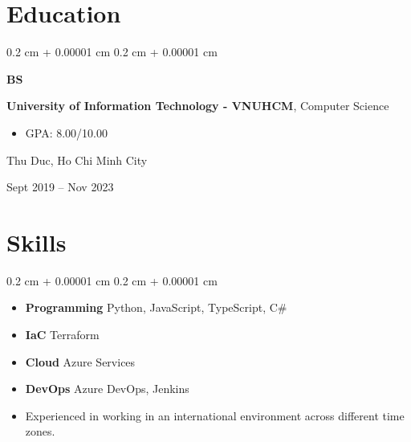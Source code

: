 \documentclass[10pt, a4paper]{article}
\newenvironment{highlights}{
    \begin{itemize}[
        topsep=0.10 cm,
        parsep=0.10 cm,
        partopsep=0pt,
        itemsep=0pt,
        leftmargin=0.4 cm + 10pt
    ]
}{
    \end{itemize}
} %
\newenvironment{highlightsforbulletentries}{
    \begin{itemize}[
        topsep=0.10 cm,
        parsep=0.10 cm,
        partopsep=0pt,
        itemsep=0pt,
        leftmargin=10pt
    ]
}{
    \end{itemize}
} %
\newenvironment{onecolentry}{
    \begin{adjustwidth}{
        0.2 cm + 0.00001 cm
    }{
        0.2 cm + 0.00001 cm
    }
}{
    \end{adjustwidth}
} %
\newenvironment{threecolentry}[3][]{
    \onecolentry
    \def\thirdColumn{#3}
    \setcolumnwidth{1 cm, \fill, 4.5 cm}
    \begin{paracol}{3}
    {\raggedright #2} \switchcolumn
}{
    \switchcolumn \raggedleft \thirdColumn
    \end{paracol}
    \endonecolentry
} %
\begin{document}
    \section{Education}



        
        \begin{threecolentry}{\textbf{BS}}{
            Thu Duc, Ho Chi Minh City

        Sept 2019 – Nov 2023
        }
            \textbf{University of Information Technology - VNUHCM}, Computer Science
            \begin{highlights}
                \item GPA: 8.00/10.00
            \end{highlights}
        \end{threecolentry}


    
    \section{Skills}

    \begin{onecolentry}
        \begin{highlightsforbulletentries}


        \item \textbf{Programming} Python, JavaScript, TypeScript, C\#

        \item \textbf{IaC} Terraform

        \item \textbf{Cloud} Azure Services

        \item \textbf{DevOps} Azure DevOps, Jenkins

        \item Experienced in working in an international environment across different time zones.


        \end{highlightsforbulletentries}
    \end{onecolentry}
\end{document}
